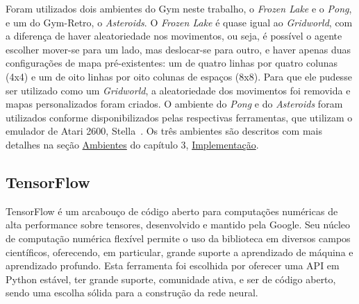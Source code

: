 Foram utilizados dois ambientes do Gym neste trabalho, o \textit{Frozen Lake} e o \textit{Pong}, e um do Gym-Retro, o \textit{Asteroids}.
O \textit{Frozen Lake} é quase igual ao \textit{Gridworld}, com a diferença de haver aleatoriedade nos movimentos, ou seja, é possível o agente escolher mover-se para um lado, mas deslocar-se para outro, e haver apenas duas configurações de mapa pré-existentes: um de quatro linhas por quatro colunas (4x4) e um de oito linhas por oito colunas de espaços (8x8).
Para que ele pudesse ser utilizado como um \textit{Gridworld}, a aleatoriedade dos movimentos foi removida e mapas personalizados foram criados.
O ambiente do \textit{Pong} e do \textit{Asteroids} foram utilizados conforme disponibilizados pelas respectivas ferramentas, que utilizam o emulador de Atari 2600, Stella~\cite{stella}.
Os três ambientes são descritos com mais detalhes na seção \hyperref[sec:envs]{Ambientes} do capítulo 3, \hyperref[cap:implementacao]{Implementação}.


\subsection{TensorFlow}
\label{sec:tensorflow}

TensorFlow é um arcabouço de código aberto para computações numéricas de alta performance sobre tensores, desenvolvido e mantido pela Google.
Seu núcleo de computação numérica flexível permite o uso da biblioteca em diversos campos científicos, oferecendo, em particular, grande suporte a aprendizado de máquina e aprendizado profundo.
Esta ferramenta foi escolhida por oferecer uma API em Python estável, ter grande suporte, comunidade ativa, e ser de código aberto, sendo uma escolha sólida para a construção da rede neural.

